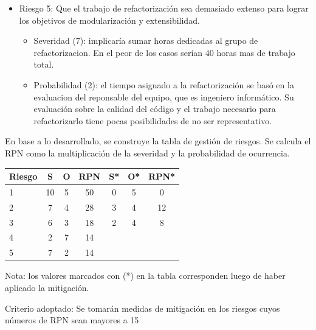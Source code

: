 \documentclass[
11pt, %
]{charter}
\begin{document}
\begin{itemize}
\begin{itemize}
\end{itemize}
\item Riesgo 5: Que el trabajo de refactorización sea demasiado extenso para lograr los objetivos de modularización y extensibilidad.
\begin{itemize}
\item Severidad (7): implicaría sumar horas dedicadas al grupo de refactorizacion. En el peor de los casos serían 40 horas mas de trabajo total.
\item Probabilidad (2): el tiempo asignado a la refactorización se basó en la evaluacion del reponsable del equipo, que es ingeniero informático. Su evaluación sobre la calidad del código y el trabajo necesario para refactorizarlo tiene pocas posibilidades de no ser representativo.
\end{itemize}
\end{itemize}

En base a lo desarrollado, se construye la tabla de gestión de riesgos. Se calcula el RPN como
la multiplicación de la severidad y la probabilidad de ocurrencia.

\begin{table}[htpb]
\centering
\begin{tabularx}{\linewidth}{@{}|X|c|c|c|c|c|c|@{}}
\hline
\rowcolor[HTML]{C0C0C0} 
Riesgo & S & O & RPN & S* & O* & RPN* \\ \hline
   1   &  10 & 5  &  50   &  0  &  5  &  0    \\ \hline
   2   &  7 & 4  &   28  &  3  &  4  &   12   \\ \hline
   3   &  6 & 3  &   18  &  2  &   4 &   8   \\ \hline
   4   &  2 & 7 &   14 &    &    &      \\ \hline
   5   &  7 & 2  &  14   &    &    &      \\ \hline
\end{tabularx}%
\end{table}

Nota: los valores marcados con (*) en la tabla corresponden luego de haber aplicado la mitigación.

Criterio adoptado: 
Se tomarán medidas de mitigación en los riesgos cuyos números de RPN sean mayores a 15
\end{document}
